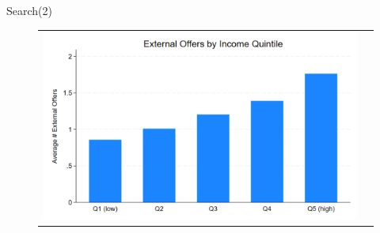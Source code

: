 \documentclass[10pt,aspectratio=169]{beamer}
\begin{document}

\begin{frame}{Search(2)}\label{slide:fig4}    

\begin{figure}[H]
\centering{}%
\begin{tabular}{cc}
\includegraphics[scale=0.27]{../figures/IE3_search_by_income_quintile.png}
\end{tabular}
\end{figure}
\hyperlink{slide:single_fig}{}
\end{frame}
\end{document}

